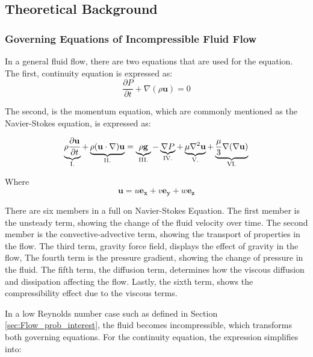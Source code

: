 \subsection{Theoretical Background}
\label{sec:Governing equations SECTION}




\subsubsection{Governing Equations of Incompressible Fluid Flow}
\label{sec:Governing equations comp}

In a general fluid flow, there are two equations that are used for the equation\cite{Konoszy2023}. The first, continuity equation is expressed as:
\begin{equation}
	\frac{\partial P}{\partial t} + \nabla(\rho \mathbf{u}) = 0
\end{equation}

The second, is the momentum equation, which are commonly mentioned as the Navier-Stokes equation, is expressed as:

\begin{equation}
	\underbrace{\rho\frac{\partial \mathbf{u}}{\partial t}}_{\rm I.} + \underbrace{\rho(\mathbf{u}\cdot \nabla)\mathbf{u}}_{\rm II.} = \underbrace{\rho\mathbf{g}}_{\rm III.} - \underbrace{\nabla P}_{\rm IV.} + \underbrace{\mu \nabla^2 \mathbf{u}}_{\rm V.} + \underbrace{\frac{\mu}{3}\nabla(\nabla \mathbf{u})}_{\rm VI.}
\end{equation}

Where
\begin{equation}
	\mathbf{u} = u \mathbf{e_x} + v \mathbf{e_y} + w \mathbf{e_z}
\end{equation}

There are six members in a full on Navier-Stokes Equation. The first member is the unsteady term, showing the change of the fluid velocity over time. The second member is the convective-advective term, showing the transport of properties in the flow. The third term, gravity force field, displays the effect of gravity in the flow, The fourth term is the pressure gradient, showing the change of pressure in the fluid. The fifth term, the diffusion term, determines how the viscous diffusion and dissipation affecting the flow. Lastly, the sixth term, shows the compressibility effect due to the viscous terms. 

In a low Reynolds number case such as defined in Section \ref{sec:Flow_prob_interest}, the fluid becomes incompressible, which transforms both governing equations\cite{Konoszy2024}. For the continuity equation, the expression simplifies into:

